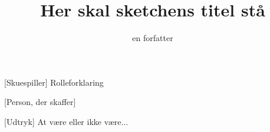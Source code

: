 \documentclass[a4paper,11pt]{article}
\title{Her skal sketchens titel stå}
\author{en forfatter}
\begin{document}
\maketitle

\begin{roles}
[Skuespiller] Rolleforklaring
\end{roles}

\begin{props}
[Person, der skaffer]
\end{props}


\begin{sketch}


[Udtryk] At være eller ikke være... 



\end{sketch}
\end{document}

